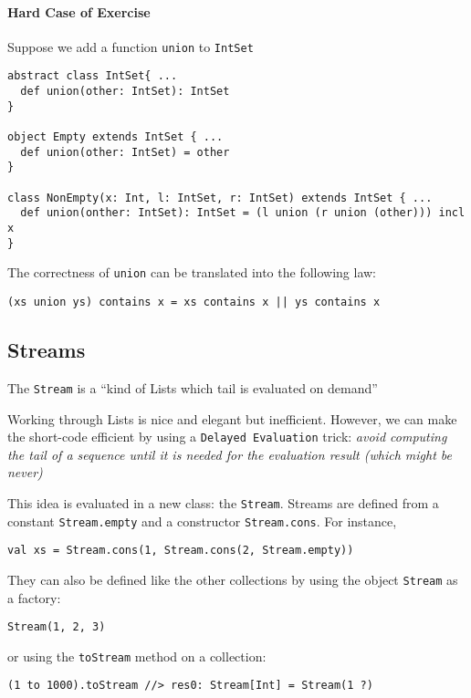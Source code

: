 \documentclass{scrartcl}
\newcommand{\term}[1]{\verb~#1~} %
\begin{document}
\begin{itemize}
\paragraph{Hard Case of Exercise}
Suppose we add a function \lstinline|union| to \lstinline|IntSet|
\begin{lstlisting}
abstract class IntSet{ ...
  def union(other: IntSet): IntSet
}

object Empty extends IntSet { ...
  def union(other: IntSet) = other
}

class NonEmpty(x: Int, l: IntSet, r: IntSet) extends IntSet { ...
  def union(onther: IntSet): IntSet = (l union (r union (other))) incl x
}
\end{lstlisting}

The correctness of \lstinline|union| can be translated into the following law:

\lstinline!(xs union ys) contains x = xs contains x || ys contains x!
\end{itemize}

\subsection{Streams}
\label{sec:Streams}
The \term{Stream} is a ``kind of Lists which tail is evaluated on demand''

Working through Lists is nice and elegant but inefficient. However, we can make
the short-code efficient by using a \term{Delayed Evaluation} trick: {\it avoid
  computing the tail of a sequence until it is needed for the evaluation result
  (which might be never)}

This idea is evaluated in a new class: the \lstinline|Stream|. Streams are
defined from a constant \lstinline|Stream.empty| and a constructor
\lstinline|Stream.cons|. For instance,
\begin{lstlisting}
val xs = Stream.cons(1, Stream.cons(2, Stream.empty))
\end{lstlisting}

They can also be defined like the other collections by using the object
\lstinline|Stream| as a factory:
\begin{lstlisting}
Stream(1, 2, 3)
\end{lstlisting}
or using the \lstinline|toStream| method on a collection:
\begin{lstlisting}
(1 to 1000).toStream //> res0: Stream[Int] = Stream(1 ?)
\end{lstlisting}
\end{document}
